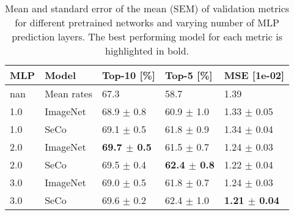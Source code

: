 \begin{table}[h]
\caption{Mean and standard error of the mean (SEM) of validation metrics for different pretrained networks and varying number of MLP prediction layers. The best performing model for each metric is highlighted in bold.}
\label{tab:mlp-layer_pretrained}
\begin{tabular}{lllll}
\toprule
MLP & Model & Top-10 [\%] & Top-5 [\%] & MSE [1e-02] \\
\midrule
nan & Mean rates & 67.3 & 58.7 & 1.39 \\
1.0 & ImageNet & 68.9 $\pm$ 0.8 & 60.9 $\pm$ 1.0 & 1.33 $\pm$ 0.05 \\
1.0 & SeCo & 69.1 $\pm$ 0.5 & 61.8 $\pm$ 0.9 & 1.34 $\pm$ 0.04 \\
2.0 & ImageNet & \textbf{69.7 $\pm$ 0.5} & 61.5 $\pm$ 0.7 & 1.24 $\pm$ 0.03 \\
2.0 & SeCo & 69.5 $\pm$ 0.4 & \textbf{62.4 $\pm$ 0.8} & 1.22 $\pm$ 0.04 \\
3.0 & ImageNet & 69.0 $\pm$ 0.5 & 61.8 $\pm$ 0.7 & 1.24 $\pm$ 0.03 \\
3.0 & SeCo & 69.6 $\pm$ 0.2 & 62.4 $\pm$ 1.0 & \textbf{1.21 $\pm$ 0.04} \\
\bottomrule
\end{tabular}
\end{table}
